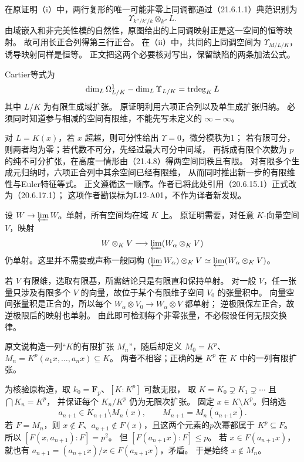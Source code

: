 在原证明（i）中，两行复形的唯一可能非零上同调都通过（21.6.1.1）典范识别为
\[
 \Upsilon_{k''/k'/k}\otimes_{k''}L.
\]
由域嵌入和非完美性模的自然性，原图给出的上同调映射正是这一空间的恒等映射。
故可用长正合列得第三行正合。
在（ii）中，共同的上同调空间为 $\Upsilon_{M/L/K}$，诱导映射同样是恒等。
正文把这两个必要核对写出，保留缺陷的两条加法公式。

Cartier等式为
\[
 \dim_L\Omega^1_{L/K}-\dim_L\Upsilon_{L/K}=\operatorname{trdeg}_K L
\]
其中 $L/K$ 为有限生成域扩张。
原证明利用六项正合列以及单生成扩张归纳。
必须同时知道参与相减的空间有限维，不能先写未定义的 $\infty-\infty$。

对 $L=K(x)$，若 $x$ 超越，则可分性给出 $\Upsilon=0$，微分模秩为1；
若有限可分，则两者均为零；若代数不可分，先经过最大可分中间域，
再拆成有限个次数为 $p$ 的纯不可分扩张，在高度一情形由（21.4.8）得两空间同秩且有限。
对有限多个生成元归纳时，六项正合列中其余空间已经有限维，
从而同时推出新一步的有限维性与Euler特征等式。
正文遵循这一顺序。作者已将此处引用（20.6.15.1）正式改为（20.6.17.1）；
这项作者勘误标为L12-A01，不作为译者新发现。

设 $W\to\varprojlim W_\alpha$ 单射，所有空间均在域 $K$ 上。
原证明需要，对任意 $K$-向量空间 $V$，映射
\[
 W\otimes_KV\longrightarrow\varprojlim(W_\alpha\otimes_KV)
\]
仍单射。这里并不需要或声称一般同构
$(\varprojlim W_\alpha)\otimes_KV\simeq\varprojlim(W_\alpha\otimes_KV)$。

若 $V$ 有限维，选取有限基，所需结论只是有限直和保持单射。
对一般 $V$，任一张量只涉及有限多个 $V$ 的向量，故位于某个有限维子空间 $V_0$ 的张量积中。
向量空间张量积是正合的，所以每个
$W_\alpha\otimes V_0\to W_\alpha\otimes V$ 都单射；
逆极限保左正合，故逆极限后的映射也单射。
由此即可检测每个非零张量，不必假设任何无限交换律。

原文说构造一列“$K$的有限扩张 $M_n$”，随后却定义
$M_0=K^p$、$M_n=K^p(a_1x,\ldots,a_nx)\subseteq K$。
两者不相容；正确的是 $K^p$ 在 $K$ 中的一列有限扩张。

为核验原构造，取 $k_0=\mathbf F_p$、$[K:K^p]$ 可数无限，
取 $K=K_0\supsetneq K_1\supsetneq\cdots$ 且 $\bigcap K_n=K^p$，
并保证每个 $K_n/K^p$ 仍为无限次扩张。
固定 $x\in K\setminus K^p$。归纳选
\[
 a_{n+1}\in K_{n+1}\setminus M_n(x),\qquad
 M_{n+1}=M_n(a_{n+1}x).
\]
若 $F=M_n$，则 $x\notin F$、$a_{n+1}\notin F(x)$，且这两个元素的$p$次幂都属于 $K^p\subseteq F$。
所以 $[F(x,a_{n+1}):F]=p^2$。
但 $[F(a_{n+1}x):F]\le p$。
若 $x\in F(a_{n+1}x)$，就也有 $a_{n+1}=(a_{n+1}x)/x\in F(a_{n+1}x)$，矛盾。
于是始终 $x\notin M_n$。

